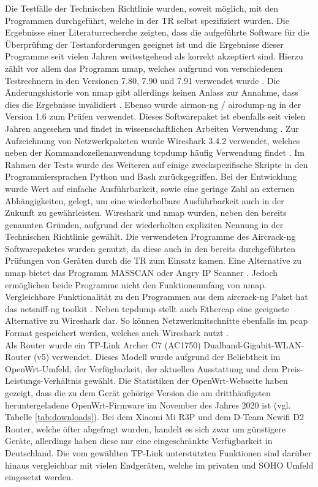 \documentclass[a4paper]{book}
\begin{document}
\begin{large}
\begin{onehalfspace}
	Die Testfälle der Technischen Richtlinie wurden, soweit möglich, mit den Programmen durchgeführt, welche in der TR selbst spezifiziert wurden. Die Ergebnisse einer Literaturrecherche zeigten, dass die aufgeführte Software für die Überprüfung der Testanforderungen geeignet ist und die Ergebnisse dieser Programme seit vielen Jahren weitestgehend als korrekt akzeptiert sind. Hierzu zählt vor allem das Programm nmap, welches aufgrund von verschiedenen Testrechnern in den Versionen 7.80, 7.90 und 7.91 verwendet wurde \cite{Lyon.2008}. Die Änderungshistorie von nmap gibt allerdings keinen Anlass zur Annahme, dass dies die Ergebnisse invalidiert \cite{GordonFyodorLyon.2020}. Ebenso wurde airmon-ng / airodump-ng in der Version 1.6 zum Prüfen verwendet. Dieses Softwarepaket ist ebenfalls seit vielen Jahren angesehen und findet in wissenschaftlichen Arbeiten Verwendung \cite{AcostaLopez.2018, Waliullah.2015}. Zur Aufzeichnung von Netzwerkpaketen wurde Wireshark 3.4.2 verwendet, welches neben der Kommandozeilenanwendung tcpdump häufig Verwendung findet \cite{Goyal.16.09.201717.09.2017, Sanders.2017}. Im Rahmen der Tests wurde des Weiteren auf einige zweckspezifische Skripte in den Programmiersprachen Python und Bash zurückgegriffen. Bei der Entwicklung wurde Wert auf einfache Ausführbarkeit, sowie eine geringe Zahl an externen Abhängigkeiten, gelegt, um eine wiederholbare Ausführbarkeit auch in der Zukunft zu gewährleisten. Wireshark und nmap wurden, neben den bereits genannten Gründen, aufgrund der wiederholten expliziten Nennung in der Technischen Richtlinie gewählt. Die verwendeten Programme des Aircrack-ng Softwarepaketes wurden genutzt, da diese auch in den bereits durchgeführten Prüfungen von Geräten durch die TR zum Einsatz kamen. Eine Alternative zu nmap bietet das Programm \glqq MASSCAN\grqq{} oder \glqq Angry IP Scanner\grqq{} \cite{MASSCAN.2020, ANGRYIP.2020}. Jedoch ermöglichen beide Programme nicht den Funktionsumfang von nmap. Vergleichbare Funktionalität zu den Programmen aus dem aircrack-ng Paket hat das \glqq netsniff-ng toolkit\grqq{} \cite{sniff.2020}. Neben tcpdump stellt auch \glqq Ethercap\grqq{} eine geeignete Alternative zu Wireshark dar. So können Netzwerkmitschnitte ebenfalls im \glqq pcap\grqq{} Format gespeichert werden, welches auch Wireshark nutzt \cite{etter.2020}.    \\ \indent
Als Router wurde ein TP-Link Archer C7 (AC1750) Dualband-Gigabit-WLAN-Router (v5) verwendet. Dieses Modell wurde aufgrund der Beliebtheit im OpenWrt-Umfeld, der Verfügbarkeit, der aktuellen Ausstattung und dem Preis-Leistungs-Verhältnis gewählt. Die Statistiken der OpenWrt-Webseite haben gezeigt, dass die zu dem Gerät gehörige Version die am dritthäufigsten heruntergeladene OpenWrt-Firmware im November des Jahres 2020 ist (vgl. Tabelle \ref{tab:downloads}). Bei dem Xiaomi Mi R3P und dem D-Team Newifi D2 Router, welche öfter abgefragt wurden, handelt es sich zwar um günstigere Geräte, allerdings haben diese nur eine eingeschränkte Verfügbarkeit in Deutschland. Die vom gewählten TP-Link unterstützten Funktionen sind darüber hinaus vergleichbar mit vielen Endgeräten, welche im privaten und SOHO Umfeld eingesetzt werden.


\end{onehalfspace}
\end{large}
\end{document}
